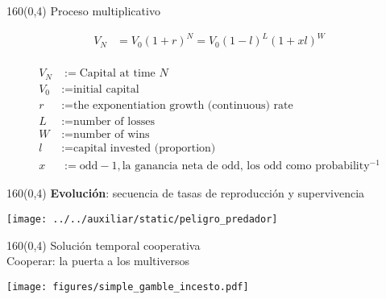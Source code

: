 \documentclass[shownotes,aspectratio=169]{beamer}
\begin{document}
\begin{frame}[plain]
 \begin{textblock}{160}(0,4)
  \centering \Large Proceso multiplicativo
 \end{textblock}
 \vspace{1cm}
 
 
\begin{align*}
 V_N & = V_0 (1+r)^N = V_0 (1-l)^L (1+xl)^W \\
\end{align*}

\vspace{-1cm}
 \begin{align*}
V_N & := \text{Capital at time } N \\
V_0 & := \text{initial capital} \\
r & := \text{the exponentiation growth (continuous) rate} \\
L &:= \text{number of losses} \\
W &:= \text{number of wins} \\
l & := \text{capital invested (proportion)} \\
x & := \text{odd}-1, \text{la ganancia neta de odd, los odd como probability$^{-1}$}
\end{align*} 
 
\end{frame}



\begin{frame}[plain]
 \begin{textblock}{160}(0,4)
  \centering \Large \textbf{Evoluci\'on}: secuencia de tasas de reproducción y supervivencia 
 \end{textblock}
\vspace{1.33cm}
 
 \centering
 \texttt{[image: ../../auxiliar/static/peligro\_predador]}

 
\end{frame}

\begin{frame}[plain]
 \begin{textblock}{160}(0,4)
  \centering \Large Solución temporal cooperativa \\ \normalsize Cooperar: la puerta a los multiversos
 \end{textblock}
 
 \centering
\vspace{1cm}
 
\texttt{[image: figures/simple\_gamble\_incesto.pdf]}

\end{frame}
\end{document}
